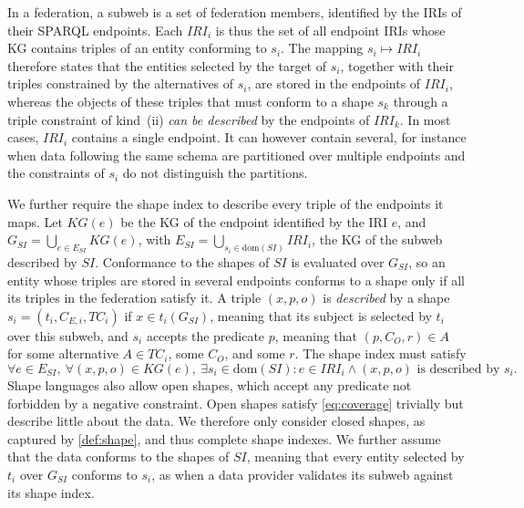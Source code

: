 In a federation, a subweb is a set of federation members, identified by the \acp{IRI} of their SPARQL endpoints.
Each $\mathit{IRI}_i$ is thus the set of all endpoint \acp{IRI} whose \ac{KG} contains triples of an entity conforming to $s_i$.
The mapping $s_i \mapsto \mathit{IRI}_i$ therefore states that the entities selected by the target of $s_i$, together with their triples constrained by the alternatives of $s_i$, are stored in the endpoints of $\mathit{IRI}_i$,
whereas the objects of these triples that must conform to a shape $s_k$ through a triple constraint of kind~(ii) \emph{can be described} by the endpoints of $\mathit{IRI}_k$.
In most cases, $\mathit{IRI}_i$ contains a single endpoint.
It can however contain several, for instance when data following the same schema are partitioned over multiple endpoints and the constraints of $s_i$ do not distinguish the partitions.

We further require the shape index to describe every triple of the endpoints it maps.
Let $\mathit{KG}(e)$ be the \ac{KG} of the endpoint identified by the \ac{IRI} $e$, and
$G_{SI} = \bigcup_{e \in E_{SI}} \mathit{KG}(e)$, with $E_{SI} = \bigcup_{s_i \in \mathrm{dom}(SI)} \mathit{IRI}_i$,
the \ac{KG} of the subweb described by $SI$.
Conformance to the shapes of $SI$ is evaluated over $G_{SI}$,
so an entity whose triples are stored in several endpoints conforms to a shape only if all its triples in the federation satisfy it.
A triple $(x, p, o)$ is \emph{described} by a shape $s_i = (t_i, C_{E,i}, \mathit{TC}_i)$ if $x \in t_i(G_{SI})$, meaning that its subject is selected by $t_i$ over this subweb,
and $s_i$ accepts the predicate $p$, meaning that $(p, C_O, r) \in A$ for some alternative $A \in \mathit{TC}_i$, some $C_O$, and some $r$.
The shape index must satisfy
\begin{equation}\label{eq:coverage}
  \forall e \in E_{SI},\ \forall (x, p, o) \in \mathit{KG}(e),\ \exists s_i \in \mathrm{dom}(SI) :
  e \in \mathit{IRI}_i \land (x, p, o) \text{ is described by } s_i.
\end{equation}
Shape languages also allow open shapes, which accept any predicate not forbidden by a negative constraint.
Open shapes satisfy \cref{eq:coverage} trivially but describe little about the data.
We therefore only consider closed shapes, as captured by \cref{def:shape}, and thus complete shape indexes.
We further assume that the data conforms to the shapes of $SI$, meaning that every entity selected by $t_i$ over $G_{SI}$ conforms to $s_i$, as when a data provider validates its subweb against its shape index.

